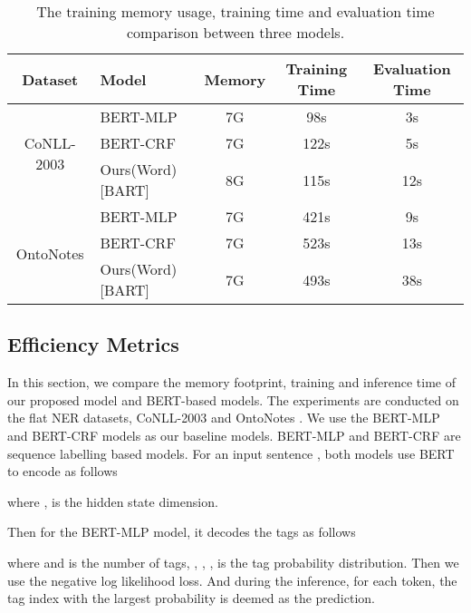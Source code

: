 \documentclass[11pt,a4paper]{article}
\begin{document}
\begin{table*}[!h]
  \centering
  \begin{tabular}{clccc}
  \toprule
  Dataset                     & Model      & Memory & Training Time& Evaluation Time\\
  \midrule
  \multirow{3}{*}{CoNLL-2003} & BERT-MLP   & 7G              & 98s           & 3s              \\
                              & BERT-CRF   & 7G              & 122s          & 5s              \\
                              & Ours(Word)[BART] & 8G              & 115s          & 12s             \\
  \midrule
  \multirow{3}{*}{OntoNotes}  & BERT-MLP   & 7G              & 421s          & 9s              \\
                              & BERT-CRF   & 7G              & 523s          & 13s             \\
                              & Ours(Word)[BART] & 7G              & 493s          & 38s         \\
  \bottomrule    
  \end{tabular}
  \caption{The training memory usage, training time and evaluation time comparison between three models. }
  \label{tb:efficiency}
\end{table*}


\subsection{Efficiency Metrics}
In this section, we compare the memory footprint, training and inference time of our proposed model and BERT-based models. The experiments are conducted on the flat NER datasets, CoNLL-2003 \cite{DBLP:conf/conll/SangM03} and OntoNotes \cite{DBLP:conf/conll/PradhanMXUZ12}. We use the BERT-MLP and BERT-CRF models as our baseline models. BERT-MLP and BERT-CRF are sequence labelling based models. For an input sentence , both models use BERT \cite{DBLP:conf/naacl/DevlinCLT19} to encode  as follows

where ,  is the hidden state dimension.

Then for the BERT-MLP model, it decodes the tags as follows

where  and  is the number of tags, , , ,  is the tag probability distribution. Then we use the negative log likelihood loss. And during the inference, for each token, the tag index with the largest probability is deemed as the prediction. 
\end{document}
